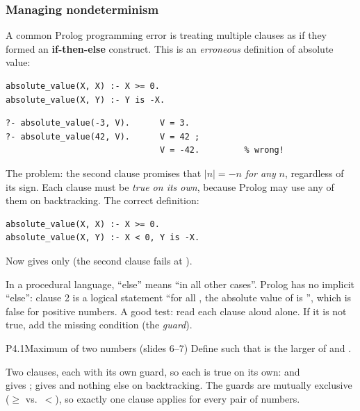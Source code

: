 \subsubsection{Managing nondeterminism}

A common Prolog programming error is treating multiple clauses as if they formed an
\textbf{if-then-else} construct. This is an \emph{erroneous} definition of absolute value:
\begin{verbatim}
absolute_value(X, X) :- X >= 0.
absolute_value(X, Y) :- Y is -X.
\end{verbatim}
\begin{verbatim}
?- absolute_value(-3, V).      V = 3.
?- absolute_value(42, V).      V = 42 ;
                               V = -42.         % wrong!
\end{verbatim}
The problem: the second clause promises that $|n| = -n$ \emph{for any} $n$, regardless of its
sign. Each clause must be \emph{true on its own}, because Prolog may use any of them on
backtracking. The correct definition:
\begin{verbatim}
absolute_value(X, X) :- X >= 0.
absolute_value(X, Y) :- X < 0, Y is -X.
\end{verbatim}
Now  gives only  (the second clause fails at
).

\begin{nbintuition}
In a procedural language, ``else'' means ``in all other cases''. Prolog has no implicit
``else'': clause 2 is a logical statement ``for all , the absolute value of 
is '', which is false for positive numbers. A good test: read each clause aloud
alone. If it is not true, add the missing condition (the \emph{guard}).
\end{nbintuition}

\begin{nbexercise}{P4.1}{Maximum of two numbers (slides 6--7)}
Define  such that  is the larger of  and .
\end{nbexercise}
\begin{nbsolution}
Two clauses, each with its own guard, so each is true on its own:
 \quad and \quad {}
\\  gives ;  gives
 and nothing else on backtracking. The guards are mutually exclusive
($\geq$ vs.\ $<$), so exactly one clause applies for every pair of numbers.
\end{nbsolution}

